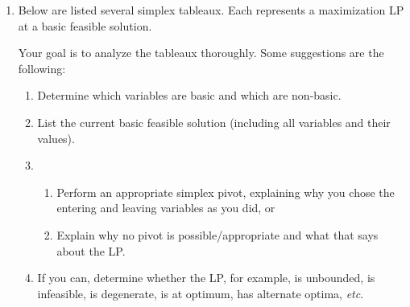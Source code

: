 \begin{enumerate}
\begin{enumerate}[label=\bfseries\Roman*)]
      \item 
	\begin{equation*}
	  \simpmat{3}{5}{
	  z&x_{{1}}&x_{{2}}&x_{{3}}&s_{{1}}&s_{{2}}&s_{{3}}&s_{{4}}&s_{{5}}&{\rhs}\\
	  \hline
	  1&\nicefrac{1}{3}&0&0&{\nicefrac{5}{12}}&0&0&\nicefrac{7}{6}&0&{\nicefrac{119}{4}}\\
	  0&{\nicefrac{5}{12}}&1&0&{\nicefrac{7}{48}}&0&0&-\nicefrac{1}{24}&0&{\nicefrac{37}{16}}\\
	  0&\nicefrac{1}{3}&0&1&-\nicefrac{1}{12}&0&0&\nicefrac{1}{6}&0&\nicefrac{5}{4}\\
	  0&{\nicefrac{43}{12}}&0&0&{\nicefrac{-19}{48}}&1&0&{\nicefrac{-11}{24}}&0&{\nicefrac{215}{16}}\\
	  0&\nicefrac{14}{3}&0&0&{\nicefrac{-5}{12}}&0&1&-\nicefrac{1}{6}&0&{\nicefrac{29}{4}}\\
	  0&{\nicefrac{47}{12}}&0&0&{\nicefrac{-59}{48}}&0&0&{\nicefrac{5}{24}}&1&{\nicefrac{15}{16}}
	  }
	\end{equation*}
	This tableau does represent a basic solution: z = , x1 = 0, x2 = , x3 = , s1 = 0, s2 = , s3 = , s4 = 0, s5 = . This is a feasible solution. This is at optimal b/c the objective row is all positive.  
    \end{enumerate}
 
 \item 
Below are listed several simplex tableaux.  Each represents a maximization LP at
a basic feasible solution.  

Your goal is to analyze the tableaux thoroughly. 
Some suggestions are the following:
\begin{enumerate}
\item Determine which variables are basic and which are non-basic.
\item List the current basic feasible solution (including all variables and their values).
\item 
\begin{enumerate}
\item  Perform an appropriate simplex pivot, explaining why you
  chose the entering and leaving variables as you did, or 
\item  Explain why no pivot is possible/appropriate and what that says about the LP.
\end{enumerate}
\item If you can, determine whether the LP, for example,
is unbounded, is infeasible, is degenerate, is at optimum, has alternate optima,
\emph{etc}.
\end{enumerate}


\end{enumerate}
